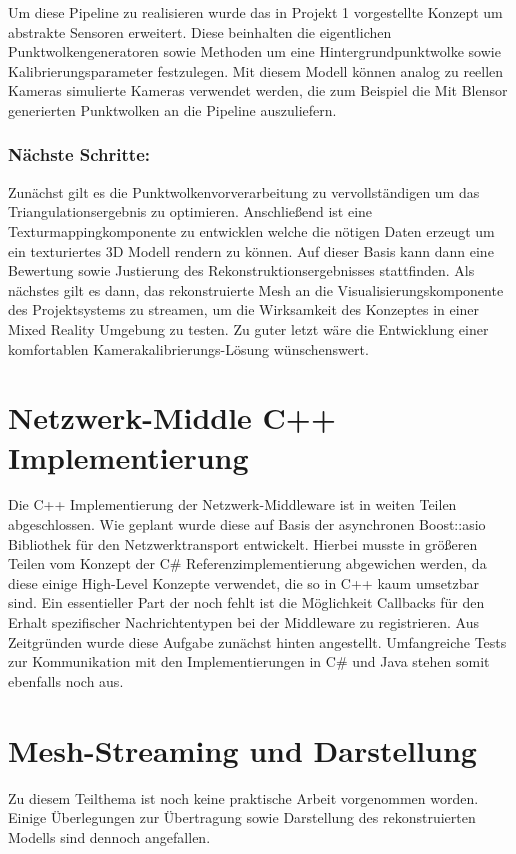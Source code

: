 Um diese Pipeline zu realisieren wurde das in Projekt 1 vorgestellte Konzept um 
abstrakte Sensoren erweitert. Diese beinhalten die eigentlichen 
Punktwolkengeneratoren sowie Methoden um eine Hintergrundpunktwolke sowie 
Kalibrierungsparameter festzulegen. Mit diesem Modell können analog zu reellen 
Kameras simulierte Kameras verwendet werden, die zum Beispiel die Mit Blensor 
generierten Punktwolken an die Pipeline auszuliefern.


\subsubsection{Nächste Schritte: } 
Zunächst gilt es die Punktwolkenvorverarbeitung zu 
vervollständigen um das Triangulationsergebnis zu optimieren. Anschließend ist 
eine Texturmappingkomponente zu entwicklen welche die nötigen Daten erzeugt um 
ein texturiertes 3D Modell rendern zu können. Auf dieser Basis kann dann eine 
Bewertung sowie Justierung des Rekonstruktionsergebnisses stattfinden. Als 
nächstes gilt es dann, das rekonstruierte Mesh an die Visualisierungskomponente 
des Projektsystems zu streamen, um die Wirksamkeit des Konzeptes in einer Mixed 
Reality Umgebung zu testen. Zu guter letzt wäre die Entwicklung einer komfortablen 
Kamerakalibrierungs-Lösung wünschenswert.

\section{Netzwerk-Middle C++ Implementierung}
Die C++ Implementierung der Netzwerk-Middleware ist in weiten Teilen abgeschlossen. 
Wie geplant wurde diese auf Basis der asynchronen Boost::asio Bibliothek für den 
Netzwerktransport entwickelt. Hierbei musste in größeren Teilen vom Konzept der C\# 
Referenzimplementierung abgewichen werden, da diese einige High-Level Konzepte 
verwendet, die so in C++ kaum umsetzbar sind. Ein essentieller Part der noch fehlt 
ist die Möglichkeit Callbacks für den Erhalt spezifischer Nachrichtentypen bei der 
Middleware zu registrieren. Aus Zeitgründen wurde diese Aufgabe zunächst hinten 
angestellt. Umfangreiche Tests zur Kommunikation mit den Implementierungen in C\# 
und Java stehen somit ebenfalls noch aus.

\section{Mesh-Streaming und Darstellung}
Zu diesem Teilthema ist noch keine praktische Arbeit vorgenommen worden. Einige Überlegungen zur Übertragung sowie Darstellung des rekonstruierten Modells sind dennoch angefallen.

